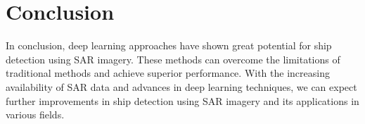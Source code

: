 \begin{sloppypar}
\section{Conclusion}
In conclusion, deep learning approaches have shown great potential for ship detection using SAR imagery. These methods can overcome the limitations of traditional methods and achieve superior performance.
With the increasing availability of SAR data and advances in deep learning techniques, we can expect further improvements in ship detection using SAR imagery and its applications in various fields.

\end{sloppypar}

